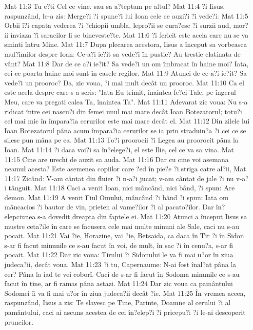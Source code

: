 Mat 11:3  Tu e?ti Cel ce vine, sau sa a?teptam pe altul?
Mat 11:4  ?i Iisus, raspunzând, le-a zis: Merge?i ?i spune?i lui Ioan cele ce auzi?i ?i vede?i:
Mat 11:5  Orbii î?i capata vederea ?i ?chiopii umbla, lepro?ii se cura?esc ?i surzii aud, mor?ii înviaza ?i saracilor li se bineveste?te.
Mat 11:6  ?i fericit este acela care nu se va sminti întru Mine.
Mat 11:7  Dupa plecarea acestora, Iisus a început sa vorbeasca mul?imilor despre Ioan: Ce-a?i ie?it sa vede?i în pustie? Au trestie clatinata de vânt?
Mat 11:8  Dar de ce a?i ie?it? Sa vede?i un om îmbracat în haine moi? Iata, cei ce poarta haine moi sunt în casele regilor.
Mat 11:9  Atunci de ce-a?i ie?it? Sa vede?i un prooroc? Da, zic voua, ?i mai mult decât un prooroc.
Mat 11:10  Ca el este acela despre care s-a scris: "Iata Eu trimit, înaintea fe?ei Tale, pe îngerul Meu, care va pregati calea Ta, înaintea Ta".
Mat 11:11  Adevarat zic voua: Nu s-a ridicat între cei nascu?i din femei unul mai mare decât Ioan Botezatorul; totu?i cel mai mic în împara?ia cerurilor este mai mare decât el.
Mat 11:12  Din zilele lui Ioan Botezatorul pâna acum împara?ia cerurilor se ia prin straduin?a ?i cei ce se silesc pun mâna pe ea.
Mat 11:13  To?i proorocii ?i Legea au proorocit pâna la Ioan.
Mat 11:14  ?i daca voi?i sa în?elege?i, el este Ilie, cel ce va sa vina.
Mat 11:15  Cine are urechi de auzit sa auda.
Mat 11:16  Dar cu cine voi asemana neamul acesta? Este asemenea copiilor care ?ed în pie?e ?i striga catre al?ii,
Mat 11:17  Zicând: V-am cântat din fluier ?i n-a?i jucat; v-am cântat de jale ?i nu v-a?i tânguit.
Mat 11:18  Caci a venit Ioan, nici mâncând, nici bând, ?i spun: Are demon.
Mat 11:19  A venit Fiul Omului, mâncând ?i bând ?i spun: Iata om mâncacios ?i bautor de vin, prieten al vame?ilor ?i al pacato?ilor. Dar în?elepciunea s-a dovedit dreapta din faptele ei.
Mat 11:20  Atunci a început Iisus sa mustre ceta?ile în care se facusera cele mai multe minuni ale Sale, caci nu s-au pocait.
Mat 11:21  Vai ?ie, Horazine, vai ?ie, Betsaida, ca daca în Tir ?i în Sidon s-ar fi facut minunile ce s-au facut în voi, de mult, în sac ?i în cenu?a, s-ar fi pocait.
Mat 11:22  Dar zic voua: Tirului ?i Sidonului le va fi mai u?or în ziua judeca?ii, decât voua.
Mat 11:23  ?i tu, Capernaume: N-ai fost înal?at pâna la cer? Pâna la iad te vei coborî. Caci de s-ar fi facut în Sodoma minunile ce s-au facut în tine, ar fi ramas pâna astazi.
Mat 11:24  Dar zic voua ca pamântului Sodomei îi va fi mai u?or în ziua judeca?ii decât ?ie.
Mat 11:25  În vremea aceea, raspunzând, Iisus a zis: Te slavesc pe Tine, Parinte, Doamne al cerului ?i al pamântului, caci ai ascuns acestea de cei în?elep?i ?i pricepu?i ?i le-ai descoperit pruncilor.
